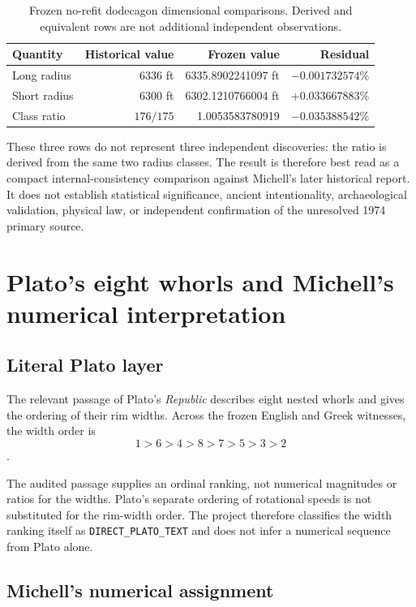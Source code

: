 \documentclass[11pt]{article}
\newcommand{\DirectPlato}{\texttt{DIRECT\_PLATO\_TEXT}}
\begin{document}
\begin{table}[ht]
\centering
\caption{Frozen no-refit dodecagon dimensional comparisons.  Derived and
equivalent rows are not additional independent observations.}%
\label{tab:sommerville}
\begin{tabular}{lrrr}
\toprule
Quantity & Historical value & Frozen value & Residual \\
\midrule
Long radius & 6336 ft & 6335.8902241097 ft & $-0.001732574\%$ \\
Short radius & 6300 ft & 6302.1210766004 ft & $+0.033667883\%$ \\
Class ratio & $176/175$ & 1.0053583780919 & $-0.035388542\%$ \\
\bottomrule
\end{tabular}
\end{table}

These three rows do not represent three independent discoveries: the ratio is
derived from the same two radius classes.  The result is therefore best read
as a compact internal-consistency comparison against Michell's later
historical report.  It does not establish statistical significance, ancient
intentionality, archaeological validation, physical law, or independent
confirmation of the unresolved 1974 primary source.

\section{Plato's eight whorls and Michell's numerical interpretation}

\subsection{Literal Plato layer}

The relevant passage of Plato's \emph{Republic} describes eight nested whorls
and gives the ordering of their rim widths.  Across the frozen English and
Greek witnesses, the width order is
\[
1>6>4>8>7>5>3>2
\]
\citep{plato1935republic,plato1902republic,perseusRepublicWitnesses}.

The audited passage supplies an ordinal ranking, not numerical magnitudes or
ratios for the widths.  Plato's separate ordering of rotational speeds is not
substituted for the rim-width order.  The project therefore classifies the
width ranking itself as \DirectPlato{} and does not infer a numerical sequence
from Plato alone.

\subsection{Michell's numerical assignment}
\end{document}
